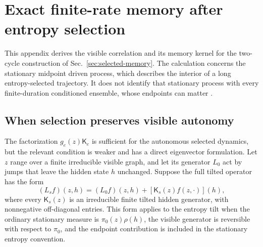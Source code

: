 \documentclass[aps,pre,reprint,amsmath,amssymb,longbibliography,floatfix]{revtex4-2}
\begin{document}
\section{Exact finite-rate memory after entropy selection}
\label{app:selected-memory}

This appendix derives the visible correlation and its memory kernel for
the two-cycle construction of Sec.~\ref{sec:selected-memory}. The
calculation concerns the stationary midpoint driven process, which
describes the interior of a long entropy-selected trajectory. It does
not identify that stationary process with every finite-duration
conditioned ensemble, whose endpoints can matter
\cite{ChetriteTouchetteControl2015}.

\subsection{When selection preserves visible autonomy}
\label{app:common-perron-line}

The factorization $g_e(z)\mathsf K_e$ is sufficient for the autonomous
selected dynamics, but the relevant condition is weaker and has a
direct eigenvector formulation. Let $z$ range over a finite irreducible
visible graph, and let its generator $L_0$ act by jumps that leave the
hidden state $h$ unchanged. Suppose the full tilted operator has the
form
\begin{equation}
 (L_s f)(z,h)=(L_0 f)(z,h)
                 +\left[\mathsf K_s(z)f(z,\cdot)\right](h),
 \label{eq:common-line-operator}
\end{equation}
where every $\mathsf K_s(z)$ is an irreducible finite tilted hidden
generator, with nonnegative off-diagonal entries. This form applies to
the entropy tilt when the ordinary stationary measure is
$\pi_0(z)\rho(h)$, the visible generator is reversible with respect to
$\pi_0$, and the endpoint contribution is included in the stationary
entropy convention.
\end{document}
